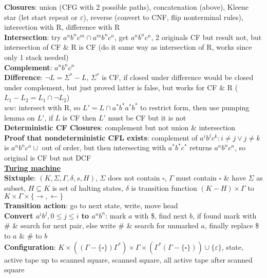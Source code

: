 \documentclass[a4paper]{article}
\begin{document}
\begin{multicols}{2}
        \textbf{Closures}: union (CFG with 2 possible paths), concatenation (above), Kleene star (let start repeat or $\varepsilon$), reverse (convert to CNF, flip nonterminal rules), interection with R, difference with R\\
        \textbf{Intersection}: try $a^n b^n c^m \cap a^m b^n c^n$, get $a^n b^n c^n$, 2 originals CF but result not, but intersection of CF \& R is CF (do it same way as intersection of R, works since only 1 stack needed)\\
        \textbf{Complement}: $a^n b^n c^n$\\
        \textbf{Difference}: $\neg L = \Sigma^* - L$, $\Sigma^*$ is CF, if closed under difference would be closed under complement, but just proved latter is false, but works for CF \& R ($L_1 - L_2 = L_1 \cap \neg L_2$)\\
        \boldmath$ww$\unboldmath: intersect with R, so $L' = L \cap a^* b^* a^* b^*$ to restrict form, then use pumping lemma on $L'$, if $L$ is CF then $L'$ must be CF but it is not\\
        \textbf{Deterministic CF Closures}: complement but not union \& intersection\\
        \textbf{Proof that nondeterministic CFL exists}: complement of $a^i b^j c^k: i \neq j \vee j \neq k$ is $a^n b^n c^n \cup$ out of order, but then intersecting with $a^* b^* c^*$ returns $a^n b^n c^n$, so original is CF but not DCF\\
        \underline{\textbf{Turing machine}}\\
        \textbf{Sixtuple}: $(K, \Sigma, \Gamma, \delta, s, H)$, $\Sigma$ does not contain $\square$, $\Gamma$ must contain $\square$ \& have $\Sigma$ as subset, $H \subseteq K$ is set of halting states, $\delta$ is transition function $(K - H) \times \Gamma$ to $K \times \Gamma \times \{ \to, \leftarrow \}$\\
        \textbf{Transition action}: go to next state, write, move head\\
        \boldmath\textbf{Convert $a^i b^j, 0 \leq j \leq i$ to $a^n b^n$}\unboldmath: mark $a$ with \$, find next $b$, if found mark with \# \& search for next pair, else write \# \& search for unmarked $a$, finally replace \$ to $a$ \& \# to $b$\\
        \textbf{Configuration}: $K \times ((\Gamma - \{\square\}) \Gamma^*) \times \Gamma \times (\Gamma^* (\Gamma - \{ \square \})) \cup \{\varepsilon\}$, state, active tape up to scanned square, scanned square, all active tape after scanned square\\

\end{multicols}
\end{document}
